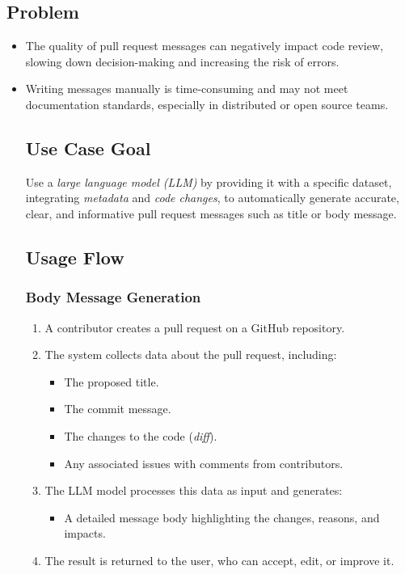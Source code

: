 \subsection{Problem}
\begin{itemize}
\item The quality of pull request messages can negatively impact code review, slowing down decision-making and increasing the risk of errors.
\item Writing messages manually is time-consuming and may not meet documentation standards, especially in distributed or open source teams.
\subsection{Use Case Goal}
Use a \textit{large language model (LLM)} by providing it with a specific dataset, integrating \textit{metadata} and \textit{code changes}, to automatically generate accurate, clear, and informative pull request messages such as title or body message.
\subsection{Usage Flow}
\subsubsection{Body Message Generation}
\begin{enumerate}
\item A contributor creates a pull request on a GitHub repository.
\item The system collects data about the pull request, including:
\begin{itemize}
\item The proposed title.
\item The commit message.
\item The changes to the code (\textit{diff}).
\item Any associated issues with comments from contributors.
\end{itemize}
\item The LLM model processes this data as input and generates:
\begin{itemize}
\item A detailed message body highlighting the changes, reasons, and impacts.
\end{itemize}
\item The result is returned to the user, who can accept, edit, or improve it.
\end{enumerate}

\end{itemize}
